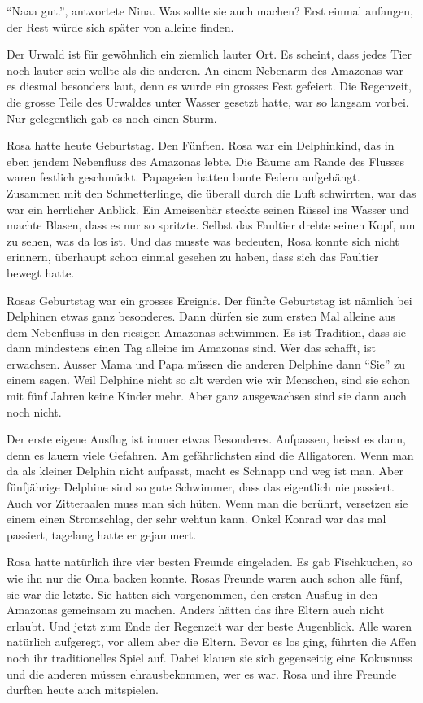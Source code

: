 \enquote{Naaa gut.}, antwortete Nina. Was sollte sie auch machen? Erst einmal anfangen, der Rest würde sich später von alleine finden.

\vspace{10pt}
 \centerline{\Huge \Dolphin[red]}
\vspace{10pt}

Der Urwald ist für gewöhnlich ein ziemlich lauter Ort. Es scheint, dass jedes Tier noch lauter sein wollte als die anderen. An einem Nebenarm des Amazonas war es diesmal besonders laut, denn es wurde ein grosses Fest gefeiert. Die Regenzeit, die grosse Teile des Urwaldes unter Wasser gesetzt hatte, war so langsam vorbei. Nur gelegentlich gab es noch einen Sturm. 

Rosa hatte heute Geburtstag. Den Fünften. Rosa war ein Delphinkind, das in eben jendem Nebenfluss des Amazonas lebte. Die Bäume am Rande des Flusses waren festlich geschmückt. Papageien hatten bunte Federn aufgehängt. Zusammen mit den Schmetterlinge, die überall durch die Luft schwirrten, war das war ein herrlicher Anblick. Ein Ameisenbär steckte seinen Rüssel ins Wasser und machte Blasen, dass es nur so spritzte. Selbst das Faultier drehte seinen Kopf, um zu sehen, was da los ist. Und das musste was bedeuten, Rosa konnte sich nicht erinnern, überhaupt schon einmal gesehen zu haben, dass sich das Faultier bewegt hatte.

Rosas Geburtstag war ein grosses Ereignis. Der fünfte Geburtstag ist nämlich bei Delphinen etwas ganz besonderes. Dann dürfen sie zum ersten Mal alleine aus dem Nebenfluss in den riesigen Amazonas schwimmen. Es ist Tradition, dass sie dann mindestens einen Tag alleine im Amazonas sind. Wer das schafft, ist erwachsen. Ausser Mama und Papa müssen die anderen Delphine dann \enquote{Sie} zu einem sagen. Weil Delphine nicht so alt werden wie wir Menschen, sind sie schon mit fünf Jahren keine Kinder mehr. Aber ganz ausgewachsen sind sie dann auch noch nicht.

Der erste eigene Ausflug ist immer etwas Besonderes. Aufpassen, heisst es dann, denn es lauern viele Gefahren. Am gefährlichsten sind die Alligatoren. Wenn man da als kleiner Delphin nicht aufpasst, macht es Schnapp und weg ist man. Aber fünfjährige Delphine sind so gute Schwimmer, dass das eigentlich nie passiert. Auch vor Zitteraalen muss man sich hüten. Wenn man die berührt, versetzen sie einem einen Stromschlag, der sehr wehtun kann. Onkel Konrad war das mal passiert, tagelang hatte er gejammert.

Rosa hatte natürlich ihre vier besten Freunde eingeladen. Es gab Fischkuchen, so wie ihn nur die Oma backen konnte. Rosas Freunde waren auch schon alle fünf, sie war die letzte. Sie hatten sich vorgenommen, den ersten Ausflug in den Amazonas gemeinsam zu machen. Anders hätten das ihre Eltern auch nicht erlaubt. Und jetzt zum Ende der Regenzeit war der beste Augenblick. Alle waren natürlich aufgeregt, vor allem aber die Eltern. Bevor es los ging, führten die Affen noch ihr traditionelles Spiel auf. Dabei klauen sie sich gegenseitig eine Kokusnuss und die anderen müssen ehrausbekommen, wer es war. Rosa und ihre Freunde durften heute auch mitspielen.

